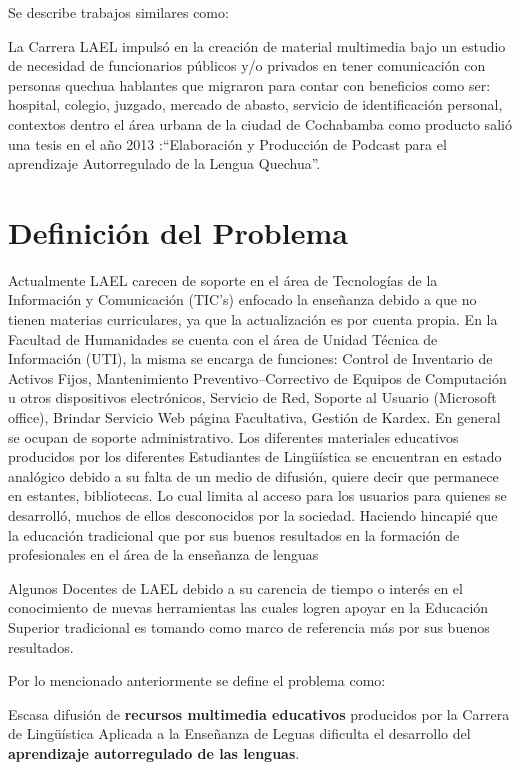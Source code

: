 Se describe trabajos similares como: 

La Carrera LAEL impulsó en la creación de material multimedia bajo un estudio de necesidad de funcionarios 
públicos y/o privados en tener comunicación con personas quechua hablantes que migraron para contar con
beneficios como ser: hospital, colegio, juzgado, mercado de abasto, servicio de identificación personal, 
contextos dentro el área urbana de la ciudad de Cochabamba como producto salió una tesis en el año 2013 
:“Elaboración y Producción de Podcast para el aprendizaje Autorregulado de la Lengua Quechua”.

\section{Definición del Problema}

Actualmente LAEL carecen de soporte en el área de Tecnologías de la Información y
Comunicación (TIC's) enfocado la enseñanza debido a que no tienen materias
curriculares, ya que la actualización es por cuenta propia.
En la Facultad de Humanidades se cuenta con el área de Unidad Técnica de
Información (UTI), la misma se encarga de funciones: Control de Inventario de
Activos Fijos, Mantenimiento Preventivo–Correctivo de Equipos de Computación u
otros dispositivos electrónicos, Servicio de Red, Soporte al Usuario (Microsoft
office), Brindar Servicio Web página Facultativa, Gestión de Kardex. En general se
ocupan de soporte administrativo.
Los diferentes materiales educativos producidos por los diferentes Estudiantes de
Lingüística se encuentran en estado analógico debido a su falta de un medio de
difusión, quiere decir que permanece en estantes, bibliotecas. Lo cual limita al acceso
para los usuarios para quienes se desarrolló, muchos de ellos desconocidos por la
sociedad.
Haciendo hincapié que la educación tradicional que por sus buenos resultados en la
formación de profesionales en el área de la enseñanza de lenguas

Algunos Docentes de LAEL debido a su carencia de tiempo o interés en el
conocimiento de nuevas herramientas las cuales logren apoyar en la Educación
Superior tradicional es tomando como marco de referencia más por sus buenos
resultados.

Por lo mencionado anteriormente se define el problema como:

Escasa difusión de \textbf{recursos multimedia educativos} producidos por la Carrera de
Lingüística Aplicada a la Enseñanza de Leguas dificulta el desarrollo del \textbf{aprendizaje
autorregulado de las lenguas}.

